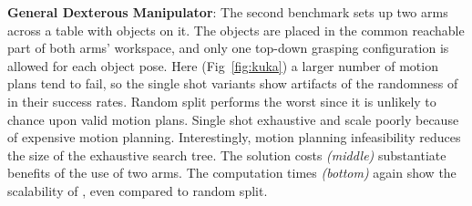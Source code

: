 
\textbf{General Dexterous Manipulator}: The second benchmark sets up two \kuka arms across a table with objects on it. The objects are placed in the common reachable part of both arms' workspace, and only one top-down grasping configuration is allowed for each object pose. Here (Fig~\ref{fig:kuka}) a larger number of motion plans tend to fail, so the single shot variants show artifacts of the randomness of \drrtstar in their success rates. 
Random split performs the worst since it is unlikely to chance upon valid motion plans. Single shot exhaustive and \milp scale poorly because of expensive motion planning.
Interestingly, motion planning infeasibility reduces the size of the exhaustive search tree.
The solution costs \textit{(middle)} substantiate benefits of the use of two arms. The computation times \textit{(bottom)} again show the scalability of \algo, even compared to random split.




